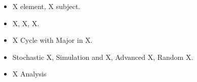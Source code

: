 \par

\begin{itemize}
\item X element, X subject.
\item X, X, X.
\end{itemize}
\divider


\begin{itemize}
\item X Cycle with Major in X.
\item Stochastic X, Simulation and X, Advanced X, Random X.
\end{itemize}

\divider

\begin{itemize}
\item X Analysis
\end{itemize}

